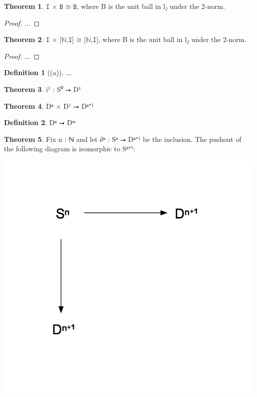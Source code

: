 \documentclass{book}
\theoremstyle{definition}
\newtheorem{definition}{Definition}
\newtheorem{theorem}{Theorem}
\begin{document}
\begin{theorem}
$\texttt{I × B ≅ B}$, where B is the unit ball in l₂ under the 2-norm.
\end{theorem}

\begin{proof}
...
\end{proof}

\begin{theorem}
$\texttt{I × [ℕ,I] ≅ [ℕ,I]}$, where B is the unit ball in l₂ under the 2-norm.
\end{theorem}

\begin{proof}
...
\end{proof}


\begin{definition}[(a)]
...
\end{definition}

\begin{theorem}
i¹ : S⁰ ⭢ D¹ 
\end{theorem}

\begin{theorem}
Dⁿ × D¹ ⭢ Dⁿ⁺¹
\end{theorem}

\begin{definition}
Dⁿ ⭢ Dᵐ
\end{definition}


\begin{theorem}
Fix n : ℕ and let ∂ⁿ : Sⁿ ⭢ Dⁿ⁺¹ be the inclusion. The pushout of the following diagram is isomorphic to Sⁿ⁺¹:
\begin{center}
\includegraphics[scale=0.5]{pushout.png}
\end{center}
\end{theorem}
\end{document}
